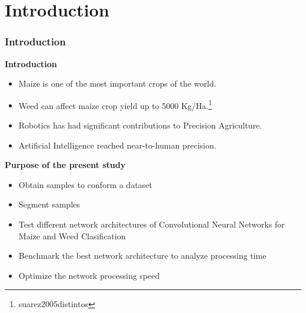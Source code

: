 \documentclass[10pt,a4paper]{beamer}
\begin{document}
\section{Introduction}
\begin{frame}
\frametitle{Introduction}
\textbf{Introduction}
\begin{itemize}
\item Maize is one of the most important crops of the world.
\item Weed can affect maize crop yield up to 5000 Kg/Ha.\footnote{suarez2005distintos} %
\item Robotics has had significant contributions to Precision Agriculture.%
\item Artificial Intelligence reached near-to-human precision.%
\end{itemize}
\textbf{Purpose of the present study}
\begin{itemize}
\item Obtain samples to conform a dataset%
\item Segment samples%
\item Test different network architectures of Convolutional Neural Networks for Maize and Weed Clasification %
\item Benchmark the best network architecture to analyze processing time %
\item Optimize the network processing speed %
\end{itemize}
\end{frame}
\end{document}
